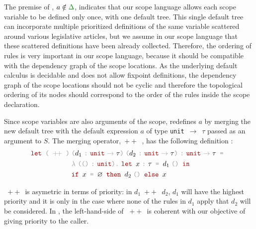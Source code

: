 \documentclass[11pt,a4paper]{article}
\newcommand{\synvar}[1]{\ensuremath{#1}}
\newcommand{\synkeyword}[1]{\textcolor{red!60!black}{\texttt{#1}}}
\newcommand{\synpunct}[1]{\textcolor{black!40!white}{\texttt{#1}}}
\newcommand{\synlet}{\synkeyword{let~}}
\newcommand{\synin}{\synkeyword{~in~}}
\newcommand{\synif}{\synkeyword{if~}}
\newcommand{\synthen}{\synkeyword{~then~}}
\newcommand{\synelse}{\synkeyword{~else~}}
\newcommand{\synequal}{\synpunct{~=~}}
\newcommand{\syntyped}{~\synpunct{:}~}
\newcommand{\syndot}{\synpunct{.}~}
\newcommand{\synunit}{\synpunct{()}}
\newcommand{\synunitt}{\synkeyword{unit}}
\newcommand{\synlambda}{\synpunct{$\lambda$}~}
\newcommand{\synlparen}{\synpunct{(}}
\newcommand{\synrparen}{\synpunct{)}}
\newcommand{\synemptydefault}{\synvar{\varnothing}}
\newcommand{\synmerge}{\synpunct{~$+\!+$~}}
\newcommand{\synarrow}{~\synpunct{$\rightarrow$}~}
\newcommand{\redctx}[1]{\textcolor{green!50!black}{\ensuremath{#1}}}
\begin{document}
The premise of , $\synvar{a}\notin\redctx{\Delta}$, indicates 
that our scope language allows each scope variable to be defined only once, with 
one default tree. This single default tree can incorporate multiple prioritized definitions 
of the same variable scattered around various legislative articles, but we 
assume in our scope language that these scattered definitions have been 
already collected. Therefore, the ordering of rules is very important in our 
scope language, because it should be compatible with the dependency graph 
of the scope locations. As the underlying default calculus is decidable and 
does not allow fixpoint definitions, the dependency graph of the scope locations 
should not be cyclic and therefore the topological ordering of its nodes
should correspond to the order of the rules inside the scope declaration.

Since scope variables are also arguments of the scope, 
redefines \synvar{a} by merging the new default tree with the default expression 
\synvar{a} of type \synunitt\synarrow\synvar{\tau} passed as an argument to \synvar{S}.
The merging operator,\synmerge, has the following definition :
\begin{align*}
\synlet \synlparen\synmerge\synrparen\;&
\synlparen\synvar{d_1}\syntyped\synunitt\synarrow\synvar{\tau}\synrparen\;
  \synlparen\synvar{d_2}\syntyped\synunitt\synarrow\synvar{\tau}\synrparen\syntyped 
  \synunitt\synarrow\synvar{\tau}
  \synequal\\
  &\synlambda\synlparen\synunit\syntyped\synunitt\synrparen\syndot
  \synlet \synvar{x}\syntyped\synvar{\tau}\synequal \synvar{d_1}\;\synunit\synin\\
  &\synif\synvar{x}\synequal\synemptydefault\synthen \synvar{d_2}\;\synunit\synelse 
  \synvar{x}
\end{align*}

\synmerge is asymetric in terms of priority: in \synvar{d_1}\synmerge\synvar{d_2},
\synvar{d_1} will have the highest priority and it is only in the case where 
none of the rules in \synvar{d_1} apply that \synvar{d_2} will be considered.
In , the left-hand-side of \synmerge is coherent with 
our objective of giving priority to the caller. 



\printbibliography
\end{document}
